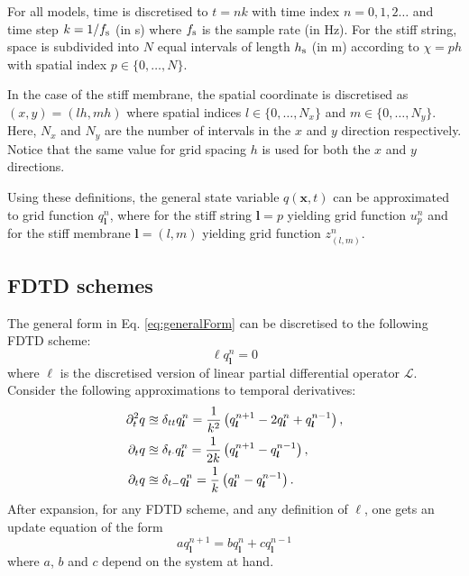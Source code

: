 \documentclass{article}
\begin{document}
For all models, time is discretised to $t = nk$ with time index $n = 0, 1, 2 \hdots$ and time step $k = 1/f_\text{s}$ (in s) where $f_\text{s}$ is the sample rate (in Hz). For the stiff string, space is subdivided into $N$ equal intervals of length $h_{\text{s}}$ (in m) according to $\chi = p h$ with spatial index $p \in \{0, \hdots, N\}$. 

In the case of the stiff membrane, the spatial coordinate is discretised as $(x, y) = (l h, m h)$ where spatial indices $l \in \{0, \hdots, N_x\}$ and $m\in\{0, \hdots, N_y\}$. Here, $N_x$ and $N_y$ are the number of intervals in the $x$ and $y$ direction respectively. Notice that the same value for grid spacing $h$ is used for both the $x$ and $y$ directions. 

Using these definitions, the general state variable $q(\boldsymbol{x}, t)$ can be approximated to grid function $q_{\boldsymbol{l}}^n$, where for the stiff string $\boldsymbol{l} = p$ yielding grid function $u_p^n$ and for the stiff membrane $\boldsymbol{l} = (l, m)$ yielding grid function $z_{(l,m)}^n$.

\subsection{FDTD schemes}
The general form in Eq. \eqref{eq:generalForm} can be discretised to the following FDTD scheme:
\begin{equation}\label{eq:generalFormDisc}
    \ell q_{\boldsymbol{l}}^n = 0
\end{equation}
where $\ell$ is the discretised version of linear partial differential operator $\mathcal{L}$. Consider the following approximations to temporal derivatives:
\begin{subequations}
\begin{align}
    \partial_t^2 q&\approxeq\delta_{tt} q_{\boldsymbol{l}}^n = \frac{1}{k^2}\left(q_{\boldsymbol{l}}^{n+1} - 2 q_{\boldsymbol{l}}^n + q_{\boldsymbol{l}}^{n-1}\right),\\
    \partial_t q&\approxeq \delta_{t\cdot} q_{\boldsymbol{l}}^n = \frac{1}{2k}\left(q_{\boldsymbol{l}}^{n+1} - q_{\boldsymbol{l}}^{n-1}\right),\label{eq:firstOrderCentred}\\
    \partial_t q&\approxeq\delta_{t-} q_{\boldsymbol{l}}^n = \frac{1}{k}\left(q_{\boldsymbol{l}}^n - q_{\boldsymbol{l}}^{n-1}\right).
\end{align}
\end{subequations}
After expansion, for any FDTD scheme, and any definition of $\ell$, one gets an update equation of the form
\begin{equation}\label{eq:generalUpdate}
    a q_{\boldsymbol{l}}^{n+1} = b q_{\boldsymbol{l}}^n + c q_{\boldsymbol{l}}^{n-1}
\end{equation}
where $a$, $b$ and $c$ depend on the system at hand. 
\end{document}
